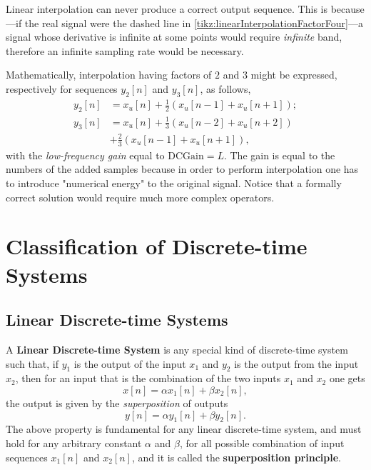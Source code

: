 \documentclass[\documentfontsize, twocolumn]{\classname}
\begin{document}
\begin{figure*}[ht]
\begin{center}
    \end{center}\caption{Interpolation of a signal $x[n]$ with factor of $4$. From top to bottom: $(a)$ original signal $x[n]$, $(b)$ upsampled version $x_u[n]$ and $(c)$ interpolated output sequence $y[n]$.}\label{tikz:linearInterpolationFactorFour}
\end{figure*}

Linear interpolation can never produce a correct output sequence. This is because---if the real signal were the dashed line in \ref{tikz:linearInterpolationFactorFour}---a signal whose derivative is infinite at some points would require \emph{infinite} band, therefore an infinite sampling rate would be necessary.

Mathematically, interpolation having factors of $2$ and $3$ might be expressed, respectively for sequences $y_2[n]$ and $y_3[n]$, as follows,
\begin{align*}
    y_2[n] &= x_u[n] + \frac 1 2(x_u[n-1] + x_u[n+1]);\\
    y_3[n] &= x_u[n] + \frac 1 3(x_u[n-2] + x_u[n+2])\\
           &+ \frac 2 3(x_u[n-1] + x_u[n+1]),
\end{align*}
with the \emph{low-frequency gain} equal to $\mbox{DCGain} = L$. The gain is equal to the numbers of the added samples because in order to perform interpolation one has to introduce "numerical energy" to the original signal. Notice that a formally correct solution would require much more complex operators.

\clearpage

\section{Classification of Discrete-time Systems}

\subsection{Linear Discrete-time Systems}

A \textbf{Linear Discrete-time System} is any special kind of discrete-time system such that, if $y_1$ is the output of the input $x_1$ and $y_2$ is the output from the input $x_2$, then for an input that is the combination of the two inputs $x_1$ and $x_2$ one gets
\begin{equation*}
    x[n] = \alpha x_1[n] + \beta x_2[n],
\end{equation*}
the output is given by the \emph{superposition} of outputs
\begin{equation}\label{eqn:linearDiscreteTimeSystem}
    y[n] = \alpha y_1[n] + \beta y_2[n].
\end{equation}
The above property is fundamental for any linear discrete-time system, and must hold for any arbitrary constant $\alpha$ and $\beta$, for all possible combination of input sequences $x_1[n]$ and $x_2[n]$, and it is called the \textbf{superposition principle}.
\end{document}

